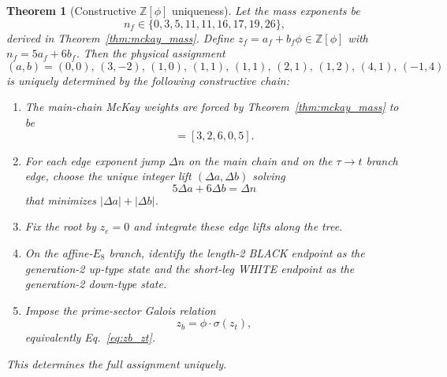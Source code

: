 \documentclass[12pt,a4paper]{article}
\newtheorem{theorem}{Theorem}
\theoremstyle{definition}
\begin{document}
\begin{theorem}[{Constructive $\mathbb{Z}[\phi]$ uniqueness}]\label{thm:uniqueness}
Let the mass exponents be
\begin{equation}
n_f \in \{0, 3, 5, 11, 11, 16, 17, 19, 26\},
\end{equation}
derived in Theorem~\ref{thm:mckay_mass}.  Define $z_f = a_f + b_f\phi \in \mathbb{Z}[\phi]$ with $n_f = 5a_f + 6b_f$.  Then the physical assignment
\begin{equation}
(a,b) = (0,0),\, (3,-2),\, (1,0),\, (1,1),\, (1,1),\, (2,1),\, (1,2),\, (4,1),\, (-1,4)
\label{eq:ab_constructive}
\end{equation}
is uniquely determined by the following constructive chain:
\begin{enumerate}
\item The main-chain McKay weights are forced by Theorem~\ref{thm:mckay_mass} to be
\begin{equation}
[N_{\mathrm{gen}},\,F(3),\,b_1,\,0,\,a_1] = [3,2,6,0,5].
\end{equation}
\item For each edge exponent jump $\Delta n$ on the main chain and on the $\tau \to t$ branch edge, choose the unique integer lift $(\Delta a,\Delta b)$ solving
\begin{equation}
5\Delta a + 6\Delta b = \Delta n
\end{equation}
that minimizes $|\Delta a| + |\Delta b|$.
\item Fix the root by $z_e = 0$ and integrate these edge lifts along the tree.
\item On the affine-$E_8$ branch, identify the length-2 BLACK endpoint as the generation-2 up-type state and the short-leg WHITE endpoint as the generation-2 down-type state.
\item Impose the prime-sector Galois relation
\begin{equation}
z_b = \phi \cdot \sigma(z_t),
\label{eq:constructive_galois_pair}
\end{equation}
equivalently Eq.~\eqref{eq:zb_zt}.
\end{enumerate}
This determines the full assignment uniquely.
\end{theorem}
\end{document}
